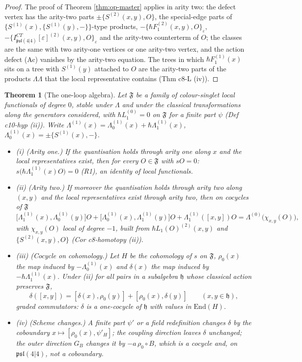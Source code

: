\documentclass[11pt]{article}
\numberwithin{equation}{section}
\theoremstyle{plain}
\newtheorem{theorem}{Theorem}[section]
\theoremstyle{definition}
\newcommand{\psl}{\mathfrak{psl}(4|4)}
\begin{document}
\begin{proof}
The proof of Theorem \ref{thm:op-master} applies in arity two: the defect vertex has the arity-two parts $\pm\{S^{(2)}(x,y),O\}$, the special-edge parts of $\{S^{(1)}(x),\{S^{(1)}(y),-\}\}$-type products, $-\{\hbar F_1^{(2)}(x,y),O\}_\varepsilon$, $-\{I^{CT}_{\psl}[\varepsilon]^{(2)}(x,y),O\}_\varepsilon$ and the arity-two counterterm of $O$; the classes are the same with two arity-one vertices or one arity-two vertex, and the action defect (Ac) vanishes by the arity-two equation. The trees in which $\hbar F_1^{(1)}(x)$ sits on a tree with $S^{(1)}(y)$ attached to $O$ are the arity-two parts of the products $\Lambda\Lambda$ that the local representative contains (Thm c8-L (iv)).
\end{proof}

\begin{theorem}[The one-loop algebra]
\label{thm:op-algebra}
Let $\mathfrak F$ be a family of colour-singlet local functionals of degree $0$, stable under $\Lambda$ and under the classical transformations along the generators considered, with $\hbar L_1^{(0)}=0$ on $\mathfrak F$ for a finite part $\psi$ (Def c10-hyp (ii)). Write $\Lambda^{(1)}(x)=\Lambda^{(1)}_0(x)+\hbar\Lambda^{(1)}_1(x)$, $\Lambda^{(1)}_0(x)=\pm\{S^{(1)}(x),-\}$.
\begin{itemize}
\item (i) (Arity one.) If the quantisation holds through arity one along $x$ and the local representatives exist, then for every $O\in\mathfrak F$ with $sO=0$: $s\big(\hbar\Lambda^{(1)}_1(x)O\big)=0$ (R1), an identity of local functionals.
\item (ii) (Arity two.) If moreover the quantisation holds through arity two along $(x,y)$ and the local representatives exist through arity two, then on cocycles of $\mathfrak F$
\begin{equation}
\big[\Lambda^{(1)}_1(x),\Lambda^{(1)}_0(y)\big]O+\big[\Lambda^{(1)}_0(x),\Lambda^{(1)}_1(y)\big]O+\Lambda^{(1)}_1([x,y])O=\Lambda^{(0)}\big(\chi_{x,y}(O)\big),
\label{eq:op-Rxy}
\end{equation}
with $\chi_{x,y}(O)$ local of degree $-1$, built from $\hbar L_1(O)^{(2)}(x,y)$ and $\{S^{(2)}(x,y),O\}$ (Cor c8-homotopy (ii)).
\item (iii) (Cocycle on cohomology.) Let $H$ be the cohomology of $s$ on $\mathfrak F$, $\rho_0(x)$ the map induced by $-\Lambda^{(1)}_0(x)$ and $\delta(x)$ the map induced by $-\hbar\Lambda^{(1)}_1(x)$. Under (ii) for all pairs in a subalgebra $\mathfrak h$ whose classical action preserves $\mathfrak F$,
\[
\delta([x,y])=[\delta(x),\rho_0(y)]+[\rho_0(x),\delta(y)]\qquad(x,y\in\mathfrak h),
\]
graded commutators: $\delta$ is a one-cocycle of $\mathfrak h$ with values in $\mathrm{End}(H)$.
\item (iv) (Scheme changes.) A finite part $\psi'$ or a field redefinition changes $\delta$ by the coboundary $x\mapsto[\rho_0(x),\psi'_H]$; the coupling direction leaves $\delta$ unchanged; the outer direction $G_B$ changes it by $-a\,\rho_0\circ B$, which is a cocycle and, on $\mathfrak{psl}(4|4)$, not a coboundary.
\end{itemize}
\end{theorem}
\end{document}
